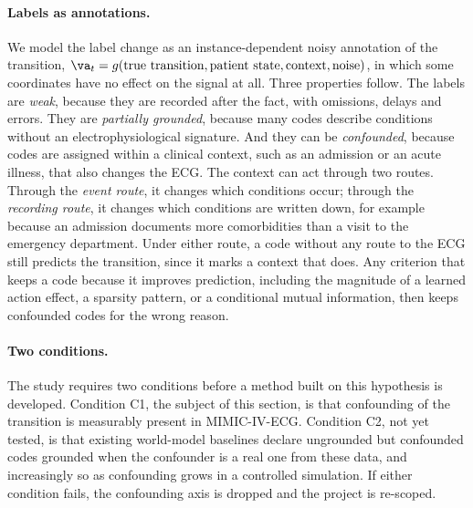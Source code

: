 \paragraph{Labels as annotations.} We model the label change as an instance-dependent noisy annotation of the transition, $\va_t=g(\text{true transition},\text{patient state},\text{context},\text{noise})$, in which some coordinates have no effect on the signal at all. Three properties follow. The labels are \emph{weak}, because they are recorded after the fact, with omissions, delays and errors. They are \emph{partially grounded}, because many codes describe conditions without an electrophysiological signature. And they can be \emph{confounded}, because codes are assigned within a clinical context, such as an admission or an acute illness, that also changes the ECG. The context can act through two routes. Through the \emph{event route}, it changes which conditions occur; through the \emph{recording route}, it changes which conditions are written down, for example because an admission documents more comorbidities than a visit to the emergency department. Under either route, a code without any route to the ECG still predicts the transition, since it marks a context that does. Any criterion that keeps a code because it improves prediction, including the magnitude of a learned action effect, a sparsity pattern, or a conditional mutual information, then keeps confounded codes for the wrong reason.

\paragraph{Two conditions.} The study requires two conditions before a method built on this hypothesis is developed. Condition C1, the subject of this section, is that confounding of the transition is measurably present in MIMIC-IV-ECG. Condition C2, not yet tested, is that existing world-model baselines declare ungrounded but confounded codes grounded when the confounder is a real one from these data, and increasingly so as confounding grows in a controlled simulation. If either condition fails, the confounding axis is dropped and the project is re-scoped.

